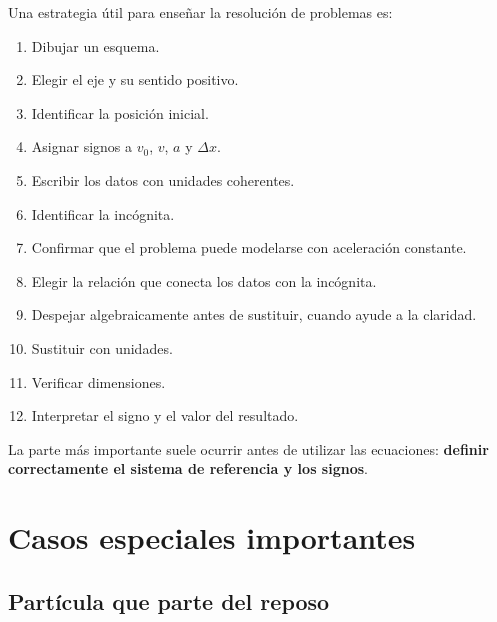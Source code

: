 \begin{notapedagogica}
Una estrategia útil para enseñar la resolución de problemas es:

\begin{enumerate}

    \item Dibujar un esquema.

    \item Elegir el eje y su sentido positivo.

    \item Identificar la posición inicial.

    \item Asignar signos a \(v_0\), \(v\), \(a\) y \(\Delta x\).

    \item Escribir los datos con unidades coherentes.

    \item Identificar la incógnita.

    \item Confirmar que el problema puede modelarse con aceleración constante.

    \item Elegir la relación que conecta los datos con la incógnita.

    \item Despejar algebraicamente antes de sustituir, cuando ayude a la
    claridad.

    \item Sustituir con unidades.

    \item Verificar dimensiones.

    \item Interpretar el signo y el valor del resultado.

\end{enumerate}

La parte más importante suele ocurrir antes de utilizar las ecuaciones:
\textbf{definir correctamente el sistema de referencia y los signos}.
\end{notapedagogica}


\section{Casos especiales importantes}

\subsection{Partícula que parte del reposo}


